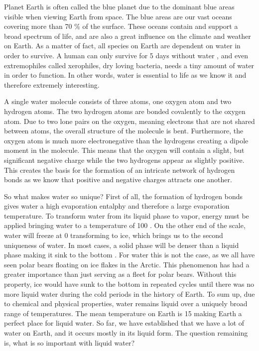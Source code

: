 



Planet Earth is often called the blue planet due to the dominant blue areas visible when viewing Earth from space. The blue areas are our vast oceans covering more than 70 \% \cite{WikiEarth} of the surface. These oceans contain and support a broad spectrum of life, and are also a great influence on the climate and weather on Earth. As a matter of fact, all species on Earth are dependent on water in order to survive. A human can only survive for 5 days without water \cite{SurviveWater}, and even extremophiles called xerophiles, dry loving bacteria, needs a tiny amount of water in order to function. In other words, water is essential to life as we know it and therefore extremely interesting. 

A single water molecule consists of three atoms, one oxygen atom and two hydrogen atoms. The two hydrogen atoms are bonded covalently to the oxygen atom. Due to two lone pairs on the oxygen, meaning electrons that are not shared between atoms, the overall structure of the molecule is bent. Furthermore, the oxygen atom is much more electronegative than the hydrogens creating a dipole moment in the molecule. This means that the oxygen will contain a slight, but significant negative charge while the two hydrogens appear as slightly positive. This creates the basis for the formation of an intricate network of hydrogen bonds as we know that positive and negative charges attracts one another.  

So what makes water so unique? First of all, the formation of hydrogen bonds gives water a high evaporation entalphy and therefore a large evaporation temperature. To transform water from its liquid phase to vapor, energy must be applied bringing water to a temperature of 100 \textcelsius. On the other end of the scale, water will freeze at 0 \textcelsius transforming to ice, which brings us to the second uniqueness of water. In most cases, a solid phase will be denser than a liquid phase making it sink to the bottom \cite{SolidWater}. For water this is not the case, as we all have seen polar bears floating on ice flakes in the Arctic. This phenomenon has had a greater importance than just serving as a fleet for polar bears. Without this property, ice would have sunk to the bottom in repeated cycles until there was no more liquid water during the cold periods in the history of Earth. To sum up, due to chemical and physical properties, water remains liquid over a uniquely broad range of temperatures. The mean temperature on Earth is 15 \textcelsius \cite{WikiEarth} making Earth a perfect place for liquid water. So far, we have established that we have a lot of water on Earth, and it occurs mostly in its liquid form. The question remaining is, what is so important with liquid water? 

